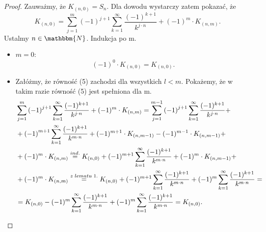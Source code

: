 \documentclass{article}
\begin{document}
\begin{proof}
Zauważmy, że $K_{(n,0)} = S_{n}$. Dla dowodu wystarczy zatem pokazać, że $$K_{(n,0)} = 
\displaystyle\sum_{j=1}^{m}\left(-1\right)^{j+1}\displaystyle\sum_{k=1}^{\infty}\frac{(-1)^{k+1}}{k^{j\cdot n}} + (-1)^{m} \cdot K_{(n,m)}.$$
Ustalmy $n \in \mathbbm{N}$.
Indukcja po m.\\
\begin{itemize}
\item $m = 0$:
$$ (-1)^0 \cdot K_{(n,0)} = K_{(n,0)}.$$
\item Załóżmy, że równość (5) zachodzi dla wszystkich $l<m$. Pokażemy, że w takim razie równość (5) jest spełniona dla m.
\begin{align*}
 & \displaystyle\sum_{j=1}^{m}\left(-1\right)^{j+1}\displaystyle\sum_{k=1}^{\infty}\frac{(-1)^{k+1}}{k^{j\cdot n}} + (-1)^{m} \cdot K_{(n,m)} =
 \displaystyle\sum_{j=1}^{m-1}\left(-1\right)^{j+1}\displaystyle\sum_{k=1}^{\infty}\frac{(-1)^{k+1}}{k^{j\cdot n}} + \\ &+
 \left(-1\right)^{m+1}\displaystyle\sum_{k=1}^{\infty}\frac{(-1)^{k+1}}{k^{m\cdot n}} + (-1)^{m+1}\cdot K_{(n,m-1)} - (-1)^{m-1}\cdot K_{(n,m-1)} + \\
 &+ (-1)^{m}\cdot K_{(n,m)} \stackrel{\tiny{ind.}}{=} K_{(n,0)} + (-1)^{m+1}\displaystyle\sum_{k=1}^{\infty}\frac{(-1)^{k+1}}{k^{m\cdot n}}
 + (-1)^{m}\cdot K_{(n,m-1)} + \\ &+ (-1)^{m}\cdot K_{(n,m)} \stackrel{\tiny{z\ lematu\ 1.}}{=} 
 K_{(n,0)} + (-1)^{m+1}\displaystyle\sum_{k=1}^{\infty}\frac{(-1)^{k+1}}{k^{m\cdot n}} + (-1)^{m}\displaystyle\sum_{k=1}^{\infty}\frac{(-1)^{k+1}}{k^{m\cdot n}} = \\
 &= K_{(n,0)} - (-1)^{m}\displaystyle\sum_{k=1}^{\infty}\frac{(-1)^{k+1}}{k^{m\cdot n}} + (-1)^{m}\displaystyle\sum_{k=1}^{\infty}\frac{(-1)^{k+1}}{k^{m\cdot n}} = K_{(n,0)}.
\end{align*}
\end{itemize}
\end{proof}

\clearpage
\end{document}
